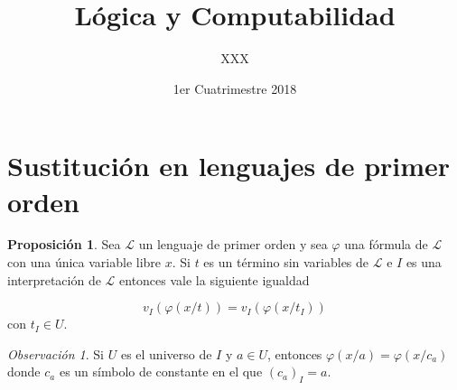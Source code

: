 \documentclass[a4paper,11pt]{article}
\title{Lógica y Computabilidad}
\author{XXX}
\date{1er Cuatrimestre 2018}
\theoremstyle{definition}
\newtheorem{prop}{Proposición}[section]
\theoremstyle{remark}
\newtheorem*{remk}{Observación}
\def\LL{\ensuremath{\mathcal{L}}}
\begin{document}
\maketitle

\section{Sustitución en lenguajes de primer orden}

\begin{prop}
    Sea $\LL$ un lenguaje de primer orden y sea $\varphi$ una fórmula de $\LL$
    con una única variable libre $x$. Si $t$ es un término sin variables de
    $\LL$ e $I$ es una interpretación  de $\LL$ entonces vale la siguiente igualdad

    \[v_I(\varphi(x/t)) = v_I(\varphi(x/t_I))\] con $t_I \in U$.
\end{prop}

\begin{remk}
    Si $U$ es el universo de $I$ y $a \in U$, entonces
    $\varphi(x/a) = \varphi(x/c_a)$ donde $c_a$ es un símbolo de constante
    en el que $(c_a)_I = a$.
\end{remk}
\end{document}
